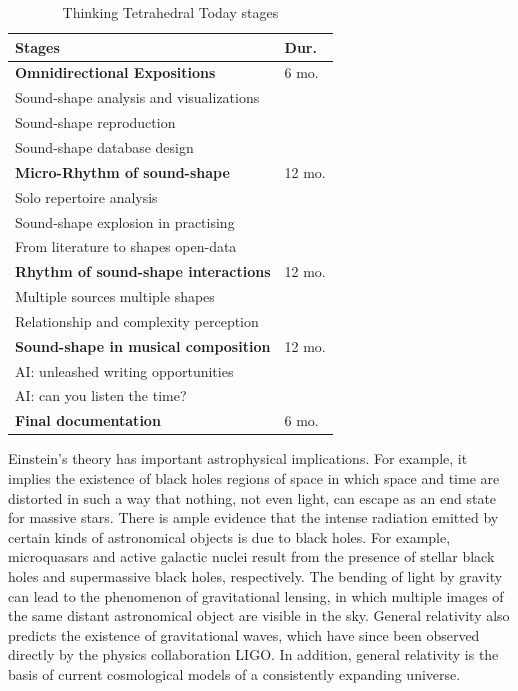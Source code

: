 \documentclass[
	a4paper,
	twocolumn
	]{article}
\begin{document}
\begin{table}[htp]
\begin{center}
\begin{tabular}{ll}
\textbf{Stages} & \textbf{Dur.} \\
\hline
\textbf{Omnidirectional Expositions} & 6 mo. \\
Sound-shape analysis and visualizations & \\
Sound-shape reproduction & \\
Sound-shape database design & \\
\hline
\textbf{Micro-Rhythm of sound-shape} & 12 mo. \\
Solo repertoire analysis & \\
Sound-shape explosion in practising & \\
From literature to shapes open-data & \\
\hline
\textbf{Rhythm of sound-shape interactions} & 12 mo. \\
Multiple sources multiple shapes & \\
Relationship and complexity perception & \\
\hline
\textbf{Sound-shape in musical composition} & 12 mo. \\
AI: unleashed writing opportunities & \\
AI: can you listen the time? & \\
\hline
\textbf{Final documentation} & 6 mo. \\
\end{tabular}
\label{timesheet}
\caption{Thinking Tetrahedral Today stages}
\end{center}
\end{table}%

Einstein's theory has important astrophysical implications. For example, it
implies the existence of black holes regions of space in which space and time
are distorted in such a way that nothing, not even light, can escape as an
end state for massive stars. There is ample evidence that the intense radiation
emitted by certain kinds of astronomical objects is due to black holes. For
example, microquasars and active galactic nuclei result from the presence of
stellar black holes and supermassive black holes, respectively. The bending of
light by gravity can lead to the phenomenon of gravitational lensing, in which
multiple images of the same distant astronomical object are visible in the sky.
General relativity also predicts the existence of gravitational waves, which
have since been observed directly by the physics collaboration LIGO. In addition,
general relativity is the basis of current cosmological models of a consistently
expanding universe.
\end{document}

